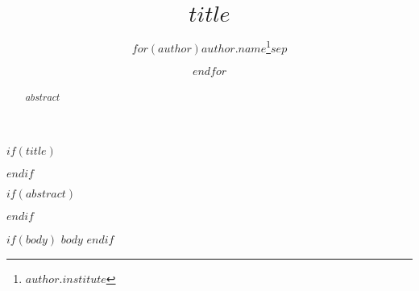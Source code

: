 \documentclass[letterpaper,10pt,twoside,onecolumn,notitlepage]{article}
\title{$title$}
\author{$for(author)$$author.name$\thanks{$author.institute$}$sep$ \and $endfor$}
\begin{document}
$if(title)$
	\maketitle
$endif$

$if(abstract)$
	\begin{abstract}
		$abstract$
	\end{abstract}
$endif$		

$if(body)$
	$body$
$endif$
\end{document}
